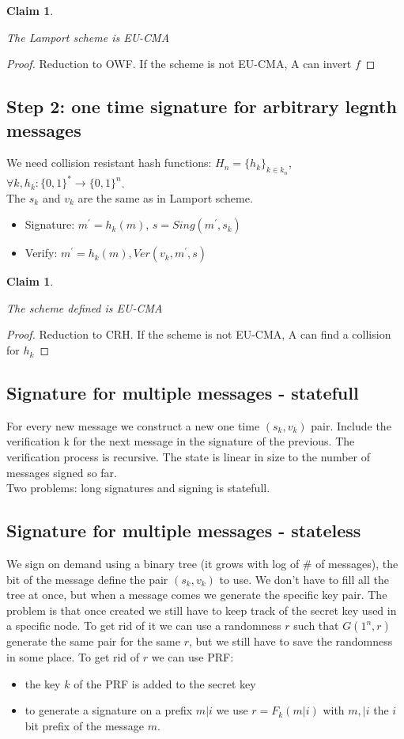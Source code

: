 \documentclass{article}
\newtheorem{clm}[thm]{Claim}
\newenvironment{claim}{\begin{clm}\begin{rm}}%
{\end{rm}\end{clm}}
\begin{document}
\begin{claim}
The Lamport scheme is EU-CMA
\end{claim}

\begin{proof}
Reduction to OWF. If the scheme is not EU-CMA, A can invert $f$
\end{proof}

\subsection{Step 2: one time signature for arbitrary legnth messages}
We need collision resistant hash functions: $H_n = \{h_k\}_{k \in k_n}$, $\forall k, h_k: \{0,1\}^* \rightarrow \{0,1\}^n$.\\ The $s_k$ and $v_k$ are the same as in Lamport scheme.
\begin{itemize}
\item Signature: $m^{'} = h_k(m)$, $s = Sing(m^{'}, s_k)$
\item Verify: $m^{'} = h_k(m), Ver(v_k,m^{'},s)$
\end{itemize}
\begin{claim}
The scheme defined is EU-CMA
\end{claim}
\begin{proof}
Reduction to CRH. If the scheme is not EU-CMA, A can find a collision for $h_k$
\end{proof}

\subsection{Signature for multiple messages - statefull}
 For every new message we construct a new one time $(s_k,v_k)$ pair. Include the verification k for the next message in the signature of the previous. The verification process is recursive. The state is linear in size to the number of messages signed so far.\\
 Two problems: long signatures and signing is statefull.
 \subsection{Signature for multiple messages - stateless}
 We sign on demand using a binary tree (it grows with log of \# of messages), the bit of the message define the pair $(s_k,v_k)$ to use. We don't have to fill all the tree at once, but when a message comes we generate the specific key pair. The problem is that once created we still have to keep track of the secret key used in a specific node.
 To get rid of it we can use a randomness $r$ such that $G(1^n,r)$ generate the same pair for the same $r$, but we still have to save the randomness in some place. To get rid of $r$ we can use PRF:
\begin{itemize}
\item the key $k$ of the PRF is added to the secret key
\item to generate a signature on a prefix $m|i$ we use $r = F_k(m|i)$ with $m,|i$ the $i$ bit prefix of the message $m$.
\end{itemize}
\end{document}
